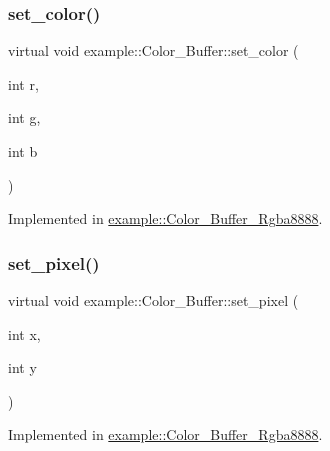 \subsubsection{\texorpdfstring{set\+\_\+color()}{set\_color()}}
{\footnotesize\ttfamily virtual void example\+::\+Color\+\_\+\+Buffer\+::set\+\_\+color (\begin{DoxyParamCaption}\item[{int}]{r,  }\item[{int}]{g,  }\item[{int}]{b }\end{DoxyParamCaption})\hspace{0.3cm}{\ttfamily [pure virtual]}}



Implemented in \mbox{\hyperlink{classexample_1_1_color___buffer___rgba8888_a408bf6adf54fc9958b74d21c8f6da178}{example\+::\+Color\+\_\+\+Buffer\+\_\+\+Rgba8888}}.

\mbox{\label{classexample_1_1_color___buffer_a967ea326ec0889a36db523727a8154b5}} 
\subsubsection{\texorpdfstring{set\+\_\+pixel()}{set\_pixel()}\hspace{0.1cm}{\footnotesize\ttfamily [1/2]}}
{\footnotesize\ttfamily virtual void example\+::\+Color\+\_\+\+Buffer\+::set\+\_\+pixel (\begin{DoxyParamCaption}\item[{int}]{x,  }\item[{int}]{y }\end{DoxyParamCaption})\hspace{0.3cm}{\ttfamily [pure virtual]}}



Implemented in \mbox{\hyperlink{classexample_1_1_color___buffer___rgba8888_aceb94fbc6797177c5a401f4d10d56766}{example\+::\+Color\+\_\+\+Buffer\+\_\+\+Rgba8888}}.

\mbox{\label{classexample_1_1_color___buffer_a1c919e629ef74e418e1ad416d0a5e85a}} 
